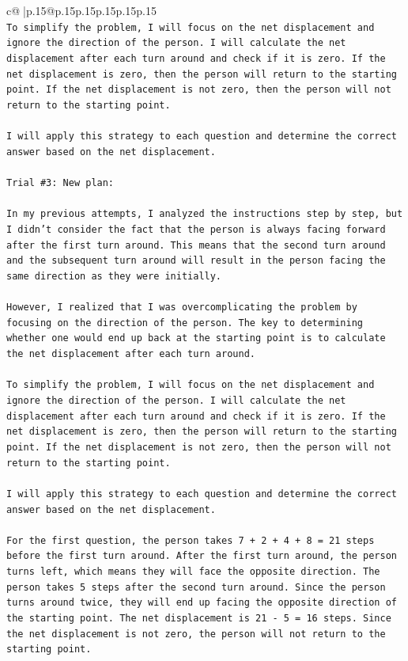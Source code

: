 \documentclass{article}
\begin{document}
{\begin{supertabular}{c@{$\;$}|p{.15\linewidth}@{}p{.15\linewidth}p{.15\linewidth}p{.15\linewidth}p{.15\linewidth}p{.15\linewidth}}
{{{\\ 
\texttt{To simplify the problem, I will focus on the net displacement and ignore the direction of the person. I will calculate the net displacement after each turn around and check if it is zero. If the net displacement is zero, then the person will return to the starting point. If the net displacement is not zero, then the person will not return to the starting point. } \\
\\ 
\texttt{I will apply this strategy to each question and determine the correct answer based on the net displacement.} \\
\\ 
\texttt{Trial \#3: New plan: } \\
\\ 
\texttt{In my previous attempts, I analyzed the instructions step by step, but I didn't consider the fact that the person is always facing forward after the first turn around. This means that the second turn around and the subsequent turn around will result in the person facing the same direction as they were initially. } \\
\\ 
\texttt{However, I realized that I was overcomplicating the problem by focusing on the direction of the person. The key to determining whether one would end up back at the starting point is to calculate the net displacement after each turn around. } \\
\\ 
\texttt{To simplify the problem, I will focus on the net displacement and ignore the direction of the person. I will calculate the net displacement after each turn around and check if it is zero. If the net displacement is zero, then the person will return to the starting point. If the net displacement is not zero, then the person will not return to the starting point. } \\
\\ 
\texttt{I will apply this strategy to each question and determine the correct answer based on the net displacement. } \\
\\ 
\texttt{For the first question, the person takes 7 + 2 + 4 + 8 = 21 steps before the first turn around. After the first turn around, the person turns left, which means they will face the opposite direction. The person takes 5 steps after the second turn around. Since the person turns around twice, they will end up facing the opposite direction of the starting point. The net displacement is 21 {-} 5 = 16 steps. Since the net displacement is not zero, the person will not return to the starting point.} \\
}}}
\end{supertabular}}
\end{document}
